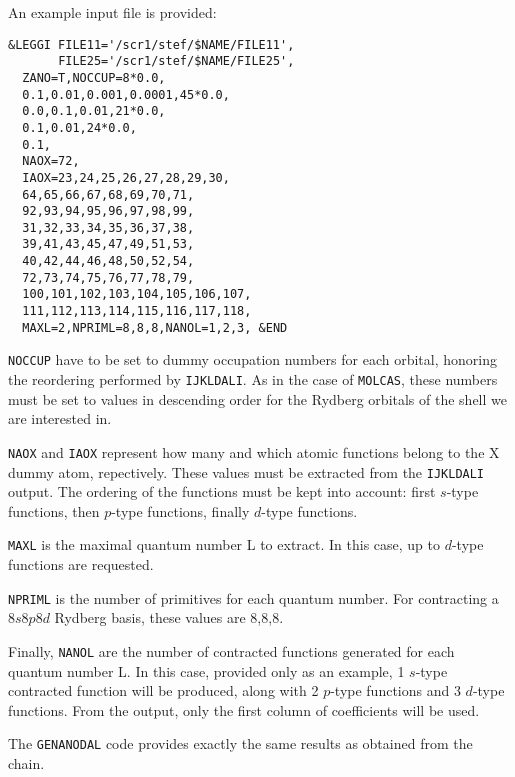 An example input file is provided:
\begin{verbatim}
&LEGGI FILE11='/scr1/stef/$NAME/FILE11',
       FILE25='/scr1/stef/$NAME/FILE25',
  ZANO=T,NOCCUP=8*0.0,
  0.1,0.01,0.001,0.0001,45*0.0,
  0.0,0.1,0.01,21*0.0,
  0.1,0.01,24*0.0,
  0.1,
  NAOX=72,
  IAOX=23,24,25,26,27,28,29,30,
  64,65,66,67,68,69,70,71,
  92,93,94,95,96,97,98,99,
  31,32,33,34,35,36,37,38,
  39,41,43,45,47,49,51,53,
  40,42,44,46,48,50,52,54,
  72,73,74,75,76,77,78,79,
  100,101,102,103,104,105,106,107,
  111,112,113,114,115,116,117,118,
  MAXL=2,NPRIML=8,8,8,NANOL=1,2,3, &END
\end{verbatim}

\texttt{NOCCUP} have to be set to dummy occupation numbers for each orbital,
honoring the reordering performed by \texttt{IJKLDALI}. As in the case of
\texttt{MOLCAS}, these numbers must be set to values in descending order for the
Rydberg orbitals of the shell we are interested in.

\texttt{NAOX} and \texttt{IAOX} represent how many and which atomic
functions belong to the X dummy atom, repectively. These values must be
extracted from the \texttt{IJKLDALI} output.  The ordering of the functions
must be kept into account: first $s$-type functions, then $p$-type
functions, finally $d$-type functions.

\texttt{MAXL} is the maximal quantum number L to extract. In this case, up to $d$-type
functions are requested.

\texttt{NPRIML} is the number of primitives for each quantum number. For contracting
a $8s8p8d$ Rydberg basis, these values are 8,8,8.

Finally, \texttt{NANOL} are the number of contracted functions generated for each
quantum number L. In this case, provided only as an example, 1 $s$-type
contracted function will be produced, along with 2 $p$-type functions and 3
$d$-type functions. From the output, only the first column of coefficients
will be used.

The \texttt{GENANODAL} code provides exactly the same results as obtained from the
\molcas chain.
